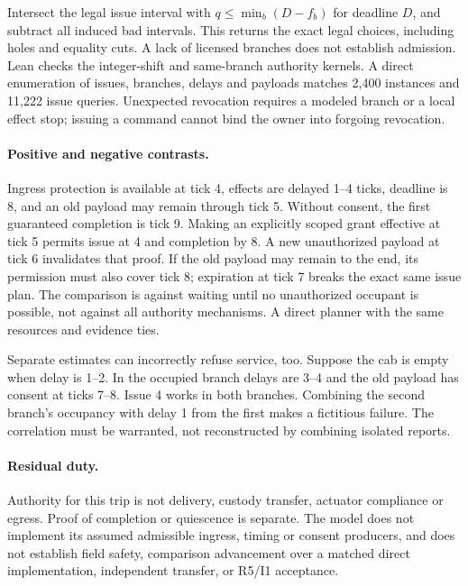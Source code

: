 \documentclass[11pt]{article}
\begin{document}
Intersect the legal issue interval with $q\le\min_b(D-f_b)$ for
deadline $D$, and subtract all induced bad intervals. This returns
the exact legal choices, including holes and equality cuts. A lack
of licensed branches does not establish admission. Lean checks
the integer-shift and same-branch authority kernels. A direct
enumeration of issues, branches, delays and payloads matches 2{,}400
instances and 11{,}222 issue queries. Unexpected revocation requires
a modeled branch or a local effect stop; issuing a command cannot
bind the owner into forgoing revocation.

\paragraph{Positive and negative contrasts.}
Ingress protection is available at tick 4, effects are delayed
1--4 ticks, deadline is 8, and an old payload may remain through
tick 5. Without consent, the first guaranteed completion is tick 9.
Making an explicitly scoped grant effective at tick 5 permits issue
at 4 and completion by 8. A new unauthorized payload at tick 6
invalidates that proof. If the old payload may remain to the end,
its permission must also cover tick 8; expiration at tick 7 breaks
the exact same issue plan. The comparison is against waiting until
no unauthorized occupant is possible, not against all authority
mechanisms. A direct planner with the same resources and evidence ties.

Separate estimates can incorrectly refuse service, too. Suppose the
cab is empty when delay is 1--2. In the occupied branch delays are
3--4 and the old payload has consent at ticks 7--8. Issue 4 works
in both branches. Combining the second branch's occupancy with
delay 1 from the first makes a fictitious failure. The correlation
must be warranted, not reconstructed by combining isolated reports.

\paragraph{Residual duty.}
Authority for this trip is not delivery, custody transfer, actuator
compliance or egress. Proof of completion or quiescence is separate.
The model does not implement its assumed admissible ingress, timing
or consent producers, and does not establish field safety, comparison
advancement over a matched direct implementation, independent transfer,
or R5/I1 acceptance.
\end{document}
